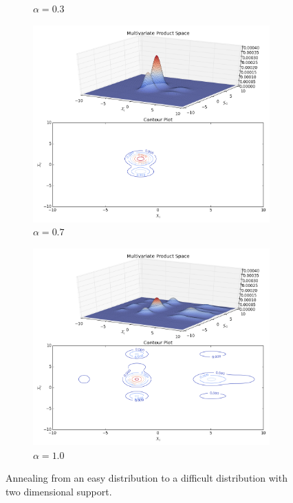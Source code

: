 \documentclass[12pt]{elsarticle}
\begin{document}
\begin{figure}
\begin{subfigure}[b]{0.49\textwidth}
        \caption{$\alpha = 0.3$}
        \label{fig:three sin x}
    \end{subfigure}
    \hfill
    \begin{subfigure}[b]{0.49\textwidth}
        \centering
       \includegraphics[width = \textwidth, trim = 3cm 11.7cm 1cm 0.5cm, clip]{plots/Annealing-Normalised/Normalised-Mix-Gaussian-anealing-animation0_70.png}
        \caption{$\alpha = 0.7$}
        \label{fig:five over x}
    \end{subfigure}
    \hfill
        \begin{subfigure}[b]{0.49\textwidth}
        \centering
       \includegraphics[width = \textwidth, trim = 3cm 11.7cm 1cm 0.5cm, clip]{plots/Annealing-Normalised/Normalised-Mix-Gaussian-anealing-animation1_00.png}
        \caption{$\alpha = 1.0$}
        \label{fig:five over x}
    \end{subfigure}
    \caption{Annealing from an easy distribution to a difficult distribution with two dimensional support.}
    \label{fig:three graphs}
\end{figure}
\end{document}
